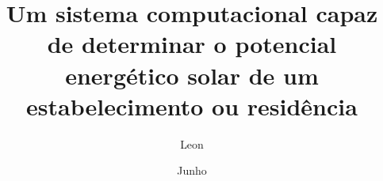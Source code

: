 \documentclass[tcc,capa]{texufpel}
\title{Um sistema computacional capaz de determinar o potencial energético solar de um estabelecimento ou residência}
\author{Leon} {Felipe Garcia de}
\date{Junho}{2021}
\begin{document}
\maketitle 
\sloppy

\fichacatalografica
\folhadeaprovacao

\newpage


 


\listoffigures %
\listoftables

\begin{NoHyper}
  \tableofcontents
\end{NoHyper}


	



%
%




\makecover
\end{document}

